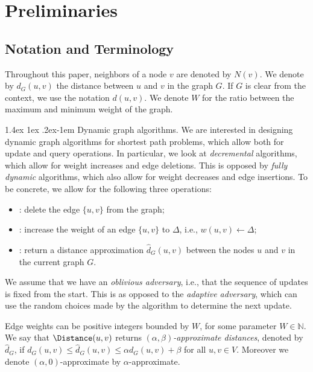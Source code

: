 \documentclass[11pt]{article}
\makeatletter
\theoremstyle{definition}
\theoremstyle{remark}
\renewcommand{\paragraph}{%
  \@startsection{paragraph}{4}%
  {\z@}{1.4ex \@plus 1ex \@minus .2ex}{-1em}%
  {\normalfont\normalsize\bfseries}%
}
\makeatother
\begin{document}
\section{Preliminaries}
\subsection{Notation and Terminology}\label{sc:notation}
Throughout this paper, neighbors of a node $v$ are denoted by $N(v)$. We denote by $d_G(u,v)$ the distance between $u$ and $v$ in the graph $G$. If $G$ is clear from the context, we use the notation $d(u,v)$. We denote $W$ for the ratio between the maximum and minimum weight of the graph.  

\paragraph{Dynamic graph algorithms.}
We are interested in designing dynamic graph algorithms for shortest path problems, which allow both for update and query operations. In particular, we look at \emph{decremental} algorithms, which allow for weight increases and edge deletions. This is opposed by \emph{fully dynamic} algorithms, which also allow for weight decreases and edge insertions. To be concrete, we allow for the following three operations:
\begin{itemize}
    \item {}: delete the edge $\{u,v\}$ from the graph;
    \item {}: increase the weight of an edge $\{u,v\}$ to $\Delta$, i.e., $w(u,v)\leftarrow \Delta $;
    \item {}: return a distance approximation $\hat d_G(u,v)$ between the nodes $u$ and $v$ in the current graph $G$.
\end{itemize}

We assume that we have an \emph{oblivious adversary}, i.e., that the sequence of updates is fixed from the start. This is as opposed to the \emph{adaptive adversary}, which can use the random choices made by the algorithm to determine the next update. 

Edge weights can be positive integers bounded by $W$, for some parameter $W\in \mathbb N$. We say that $\Distance(u,v)$ returns \emph{$(\alpha,\beta)$-approximate distances}, denoted by $\hat d_G$, if $d_G(u,v) \leq \hat d_G(u,v) \leq \alpha d_G(u,v)+\beta$ for all $u,v\in V$. Moreover we denote $(\alpha,0)$-approximate by $\alpha$-approximate. 
\end{document}
